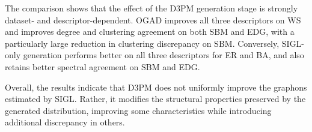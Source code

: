 The comparison shows that the effect of the D3PM generation stage is strongly dataset- and descriptor-dependent. OGAD improves all three descriptors on WS and improves degree and clustering agreement on both SBM and EDG, with a particularly large reduction in clustering discrepancy on SBM. Conversely, SIGL-only generation performs better on all three descriptors for ER and BA, and also retains better spectral agreement on SBM and EDG.

Overall, the results indicate that D3PM does not uniformly improve the graphons estimated by SIGL. Rather, it modifies the structural properties preserved by the generated distribution, improving some characteristics while introducing additional discrepancy in others.
